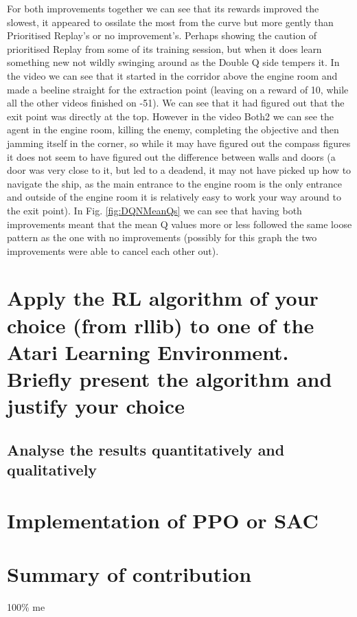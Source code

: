 \documentclass[a4pape, 11pt, english]{article}
\begin{document}
For both improvements together we can see that its rewards improved the slowest, it appeared to ossilate the most from the curve but more gently than Prioritised Replay's or no improvement's. Perhaps showing the caution of prioritised Replay from some of its training session, but when it does learn something new not wildly swinging around as the Double Q side tempers it. In the video we can see that it started in the corridor above the engine room and made a beeline straight for the extraction point (leaving on a reward of 10, while all the other videos finished on -51). We can see that it had figured out that the exit point was directly at the top. However in the video Both2 we can see the agent in the engine room, killing the enemy, completing the objective and then jamming itself in the corner, so while it may have figured out the compass figures it does not seem to have figured out the difference between walls and doors (a door was very close to it, but led to a deadend, it may not have picked up how to navigate the ship, as the main entrance to the engine room is the only entrance and outside of the engine room it is relatively easy to work your way around to the exit point). In Fig. \ref{fig:DQNMeanQs} we can see that having both improvements meant that the mean Q values more or less followed the same loose pattern as the one with no improvements (possibly for this graph the two improvements were able to cancel each other out).

\section{Apply the RL algorithm of your choice (from rllib) to one of the Atari Learning Environment. Briefly present the algorithm and justify your choice}

\subsection{Analyse the results quantitatively and qualitatively}

\section{Implementation of PPO or SAC}

\section{Summary of contribution}
100\% me


\end{document}
